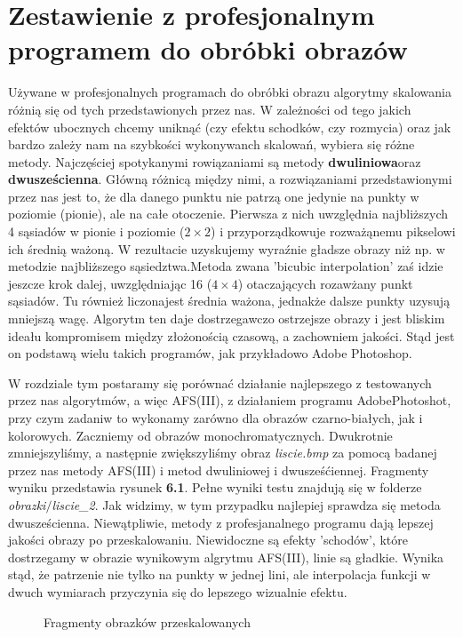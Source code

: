 \section{Zestawienie z profesjonalnym programem do obróbki obrazów}
Używane w profesjonalnych programach do obróbki obrazu algorytmy skalowania
różnią się od tych przedstawionych przez nas. W zależności od tego jakich
efektów ubocznych chcemy uniknąć (czy efektu schodków, czy rozmycia) oraz jak
bardzo zależy nam na szybkości wykonywanch skalowań, wybiera się różne metody.
Najczęściej spotykanymi rowiązaniami są metody
\textbf{dwuliniowa}oraz \textbf{dwusześcienna}.
Główną różnicą między nimi, a
rozwiązaniami przedstawionymi przez nas jest to, że dla danego punktu nie
patrzą one jedynie na punkty w poziomie (pionie), ale na całe otoczenie.
Pierwsza z nich uwzględnia najbliższych 4 sąsiadów w pionie i poziomie
($2\times2$) i przyporządkowuje rozważąnemu pikselowi ich średnią ważoną.
W rezultacie uzyskujemy wyraźnie gładsze obrazy niż np. w metodzie
najbliższego sąsiedztwa.Metoda zwana 'bicubic interpolation' zaś idzie jeszcze krok dalej, uwzględniając 16 ($4\times4$) otaczających rozawżany punkt sąsiadów. Tu również
liczonajest średnia ważona, jednakże dalsze punkty uzysują mniejszą wagę.
Algorytm ten daje dostrzegawczo ostrzejsze obrazy i jest bliskim ideału
kompromisem między złożonością czasową, a zachowniem jakości. Stąd jest on
podstawą wielu takich programów, jak przykładowo Adobe Photoshop.

W rozdziale tym postaramy się porównać działanie najlepszego z testowanych przez
nas algorytmów, a więc AFS(III), z działaniem programu AdobePhotoshot, przy czym zadaniw to
wykonamy zarówno dla obrazów czarno-białych, jak i kolorowych. Zaczniemy od obrazów
monochromatycznych. Dwukrotnie zmniejszyliśmy, a następnie zwiększyliśmy obraz
\textit{liscie.bmp} za pomocą badanej przez nas metody AFS(III) i metod dwuliniowej
i dwusześćiennej. Fragmenty wyniku przedstawia rysunek \textbf{6.1}. Pełne wyniki
testu znajdują się w folderze \textit{obrazki$\slash$liscie\_2}. Jak widzimy, w
tym przypadku najlepiej sprawdza się metoda dwusześcienna. Niewątpliwie, metody z profesjanalnego programu
dają lepszej jakości obrazy po przeskalowaniu. Niewidoczne są efekty 'schodów',
które dostrzegamy w obrazie wynikowym algrytmu AFS(III), linie są gładkie. Wynika stąd, że patrzenie nie tylko na punkty w jednej lini, ale interpolacja
funkcji w dwuch wymiarach przyczynia się do lepszego wizualnie efektu.
\begin{figure}[h!tb]
\begin{center}
\caption{Fragmenty obrazków przeskalowanych}
\end{center}
\end{figure}


